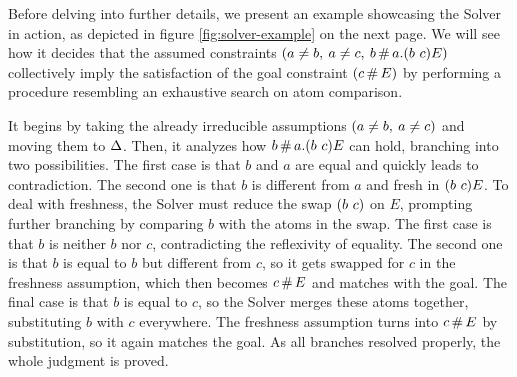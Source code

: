 \documentclass[english, mgr]{iithesis}
\begin{document}
Before delving into further details, we present an example showcasing the Solver in action, as depicted in figure \ref{fig:solver-example} on the next page.
We will see how it decides that the assumed constraints $(a \neq b,\: a \neq c,\: b \,\#\, a.(b\ c) E)$
collectively imply the satisfaction of the goal constraint $(c \,\#\, E)$
by performing a procedure resembling an exhaustive search on atom comparison.

It begins by taking the already irreducible assumptions $(a \neq b,\: a \neq c)$ and moving them to $\Delta$.
Then, it analyzes how $b \,\#\, a.(b\ c) E$
can hold, branching into two possibilities.
The first case is that $b$ and $a$ are equal and quickly leads to contradiction.
The second one is that $b$ is different from $a$ and fresh in $(b\ c) E$.
To deal with freshness, the Solver must reduce the swap $\permswap{b}{c}$ on $E$,
prompting further branching by comparing $b$ with the atoms in the swap.
The first case is that $b$ is neither $b$ nor $c$, contradicting the reflexivity of equality.
The second one is that $b$ is equal to $b$ but different from $c$, so it gets swapped for $c$
in the freshness assumption, which then becomes $c \,\#\, E$ and matches with the goal.
The final case is that $b$ is equal to $c$, so the Solver merges these atoms together,
substituting $b$ with $c$ everywhere.
The freshness assumption turns into $c \,\#\, E$ by substitution, so it again matches the goal.
As all branches resolved properly, the whole judgment is proved.
\end{document}
